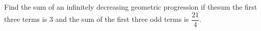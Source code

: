 
%
%
%
%
% 
% 

\question Find the sum of an infinitely decreasing geometric progression if thesum the first three terms is $3$ and the sum of the first three odd terms is $\dfrac{21}{4}$.

\insertQR{}

\ifprintanswers
\fi 

